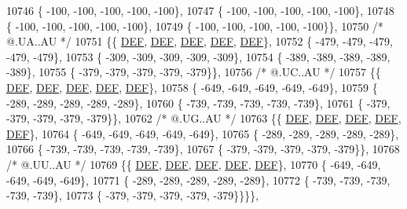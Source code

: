 \begin{DoxyCode}
10746 \{ -100, -100, -100, -100, -100\},
10747 \{ -100, -100, -100, -100, -100\},
10748 \{ -100, -100, -100, -100, -100\},
10749 \{ -100, -100, -100, -100, -100\}\},
10750 \textcolor{comment}{/*  @.UA..AU */}
10751 \{\{  \mbox{\hyperlink{1_88_84__epars_8h_a397419fc12b37ed479c8abb9d444d843}{DEF}},  \mbox{\hyperlink{1_88_84__epars_8h_a397419fc12b37ed479c8abb9d444d843}{DEF}},  \mbox{\hyperlink{1_88_84__epars_8h_a397419fc12b37ed479c8abb9d444d843}{DEF}},  \mbox{\hyperlink{1_88_84__epars_8h_a397419fc12b37ed479c8abb9d444d843}{DEF}},  \mbox{\hyperlink{1_88_84__epars_8h_a397419fc12b37ed479c8abb9d444d843}{DEF}}\},
10752 \{ -479, -479, -479, -479, -479\},
10753 \{ -309, -309, -309, -309, -309\},
10754 \{ -389, -389, -389, -389, -389\},
10755 \{ -379, -379, -379, -379, -379\}\},
10756 \textcolor{comment}{/*  @.UC..AU */}
10757 \{\{  \mbox{\hyperlink{1_88_84__epars_8h_a397419fc12b37ed479c8abb9d444d843}{DEF}},  \mbox{\hyperlink{1_88_84__epars_8h_a397419fc12b37ed479c8abb9d444d843}{DEF}},  \mbox{\hyperlink{1_88_84__epars_8h_a397419fc12b37ed479c8abb9d444d843}{DEF}},  \mbox{\hyperlink{1_88_84__epars_8h_a397419fc12b37ed479c8abb9d444d843}{DEF}},  \mbox{\hyperlink{1_88_84__epars_8h_a397419fc12b37ed479c8abb9d444d843}{DEF}}\},
10758 \{ -649, -649, -649, -649, -649\},
10759 \{ -289, -289, -289, -289, -289\},
10760 \{ -739, -739, -739, -739, -739\},
10761 \{ -379, -379, -379, -379, -379\}\},
10762 \textcolor{comment}{/*  @.UG..AU */}
10763 \{\{  \mbox{\hyperlink{1_88_84__epars_8h_a397419fc12b37ed479c8abb9d444d843}{DEF}},  \mbox{\hyperlink{1_88_84__epars_8h_a397419fc12b37ed479c8abb9d444d843}{DEF}},  \mbox{\hyperlink{1_88_84__epars_8h_a397419fc12b37ed479c8abb9d444d843}{DEF}},  \mbox{\hyperlink{1_88_84__epars_8h_a397419fc12b37ed479c8abb9d444d843}{DEF}},  \mbox{\hyperlink{1_88_84__epars_8h_a397419fc12b37ed479c8abb9d444d843}{DEF}}\},
10764 \{ -649, -649, -649, -649, -649\},
10765 \{ -289, -289, -289, -289, -289\},
10766 \{ -739, -739, -739, -739, -739\},
10767 \{ -379, -379, -379, -379, -379\}\},
10768 \textcolor{comment}{/*  @.UU..AU */}
10769 \{\{  \mbox{\hyperlink{1_88_84__epars_8h_a397419fc12b37ed479c8abb9d444d843}{DEF}},  \mbox{\hyperlink{1_88_84__epars_8h_a397419fc12b37ed479c8abb9d444d843}{DEF}},  \mbox{\hyperlink{1_88_84__epars_8h_a397419fc12b37ed479c8abb9d444d843}{DEF}},  \mbox{\hyperlink{1_88_84__epars_8h_a397419fc12b37ed479c8abb9d444d843}{DEF}},  \mbox{\hyperlink{1_88_84__epars_8h_a397419fc12b37ed479c8abb9d444d843}{DEF}}\},
10770 \{ -649, -649, -649, -649, -649\},
10771 \{ -289, -289, -289, -289, -289\},
10772 \{ -739, -739, -739, -739, -739\},
10773 \{ -379, -379, -379, -379, -379\}\}\}\},

\end{DoxyCode}

